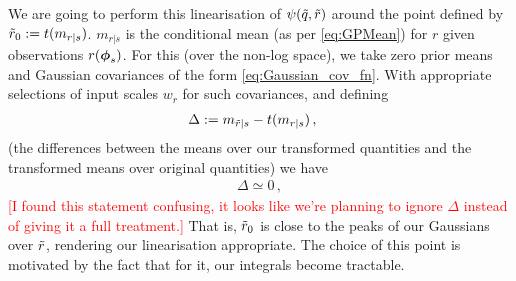 \documentclass{article}
\begin{document}
We are going to perform this linearisation of $\psi(\tq,\tr)$ around the point defined by $\tr_0 \deq t(m_{r|s})$. $m_{r|s}$ is the \gpb conditional mean (as per \eqref{eq:GPMean}) for $r$ given observations $r(\vph_s)$. For this \gpb (over the non-log space), we take zero prior means and Gaussian
covariances of the form \eqref{eq:Gaussian_cov_fn}. With appropriate selections of input scales $w_r$ for such covariances, and defining
\begin{align*}
\Delta & \deq m_{\tilde{r}|s} - t(m_{r|s})\,,
\end{align*}
(the differences between the \gpb means over our transformed quantities and the transformed \gpb means over original quantities) we have
\begin{align}\label{eq:mt_sim_tm}
\Delta \simeq 0\,,
\end{align}
\textcolor{red}{[I found this statement confusing, it looks like we're planning to ignore $\Delta$ instead of giving it a full treatment.]}
That is, $\tr_0$ is close to the peaks of our Gaussians over $\tr$, rendering our linearisation appropriate. The choice of this point is motivated by the fact that for it, our integrals become tractable.
\end{document}
